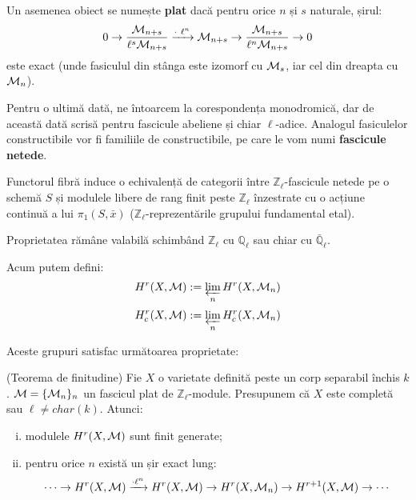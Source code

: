 \documentclass[13pt,openany,oneside]{book}
\begin{document}
Un asemenea obiect se numește {\bf plat} dacă pentru orice $n$ și $s$ naturale, șirul:
$$0 \rightarrow \frac{\mathcal{M}_{n+s}}{\ell^s\mathcal{M}_{n+s}} \xrightarrow{\cdot\ \ell^n} \mathcal{M}_{n+s} \rightarrow \frac{\mathcal{M}_{n+s}}{\ell^n\mathcal{M}_{n+s}} \rightarrow 0$$
este exact (unde fasiculul din stânga este izomorf cu $\mathcal{M}_s$, iar cel din dreapta cu $\mathcal{M}_n$).

Pentru o ultimă dată, ne întoarcem la corespondența monodromică, dar de această dată scrisă pentru fascicule abeliene și chiar $\ell$-adice. Analogul fasiculelor constructibile vor fi familiile de constructibile, pe care le vom numi {\bf fascicule netede}.

\begin{teo}
Functorul fibră induce o echivalență de categorii între $\mathbb{Z}_\ell$-fascicule netede pe o schemă $S$ și modulele libere de rang finit peste $\mathbb{Z}_\ell$ înzestrate cu o acțiune continuă a lui $\pi_1(S,\bar{x})$ ($\mathbb{Z}_\ell$-reprezentările grupului fundamental etal).
\end{teo}

\begin{obs}
Proprietatea rămâne valabilă schimbând $\mathbb{Z}_\ell$ cu $\mathbb{Q}_\ell$ sau chiar cu $\bar{\mathbb{Q}}_\ell$.
\end{obs}

Acum putem defini:
$$H^r(X,\mathcal{M}):=\varprojlim_n H^r(X,\mathcal{M}_n)$$
$$H^r_c(X,\mathcal{M}):=\varprojlim_n H^r_c(X,\mathcal{M}_n)$$

Aceste grupuri satisfac următoarea proprietate:

\begin{teo}
(Teorema de finitudine) Fie $X$ o varietate definită peste un corp separabil închis $k$. $\mathcal{M}=\{\mathcal{M}_n\}_n$ un fascicul plat de $\mathbb{Z}_\ell$-module. Presupunem că $X$ este completă sau $\ell \neq char(k)$. Atunci:
\begin{enumerate}[(i)]
\item modulele $H^r(X,\mathcal{M})$ sunt finit generate;
\item pentru orice $n$ există un șir exact lung:
$$\cdots \rightarrow H^r(X,\mathcal{M}) \xrightarrow{\cdot \ell^n} H^r(X,\mathcal{M}) \rightarrow H^r(X,\mathcal{M}_n) \rightarrow H^{r+1}(X,\mathcal{M}) \rightarrow \cdots$$
\end{enumerate}
\end{teo}
\end{document}
